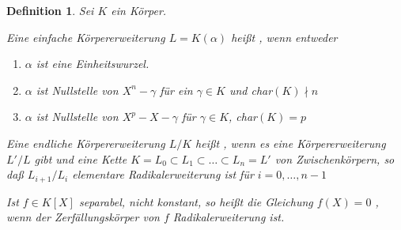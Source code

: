 \documentclass[a4paper,10pt,german]{scrbook}
\theoremstyle{saetze}
\theoremstyle{definitionen}
\newtheorem{Def}{Definition}[section]
\begin{document}
\begin{Def}
Sei $K$ ein Körper.
\begin{enum}

\item Eine einfache Körpererweiterung $L=K(\alpha)$ heißt
, wenn entweder

\begin{enumerate}
\item[(i)] $\alpha$ ist eine Einheitswurzel.
\item[(ii)] $\alpha$ ist Nullstelle von $X^n - \gamma$ für ein
$\gamma \in K$ und char$(K) \nmid n$
\item[(iii)] $\alpha$ ist Nullstelle von $X^p - X - \gamma$ für
$\gamma \in K$, char$(K) = p$
\end{enumerate}

\item Eine endliche Körpererweiterung $L/K$ heißt
, wenn es eine Körpererweiterung $L'/L$ gibt
und eine Kette $K=L_0 \subset L_1 \subset \dots \subset L_n = L'$
von Zwischenkörpern, so daß $L_{i+1}/L_i$ elementare
Radikalerweiterung ist für $i=0,\dots,n-1$

\item Ist $f \in K[X]$ separabel, nicht konstant, so heißt die
Gleichung $f(X) = 0$ , wenn der
Zerfällungskörper von $f$ Radikalerweiterung ist.
\end{enum}

\end{Def}
\end{document}
